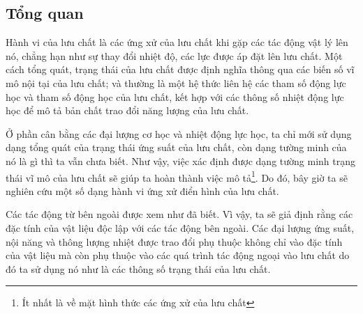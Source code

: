 \documentclass[../../../main.tex]{subfiles}
\begin{document}
\subsection{Tổng quan}
	Hành vi của lưu chất là các ứng xử của lưu chất khi gặp các tác động vật lý lên nó, chẳng hạn như sự thay đổi nhiệt độ, các lực được áp đặt lên lưu chất. Một cách tổng quát, trạng thái của lưu chất được định nghĩa thông qua các biến số vĩ mô nội tại của lưu chất; và thường là một hệ thức liên hệ các tham số động lực học và tham số động học của lưu chất, kết hợp với các thông số nhiệt động lực học để mô tả bản chất trao đổi năng lượng của lưu chất.
	
	Ở phần cân bằng các đại lượng cơ học và nhiệt động lực học, ta chỉ mới sử dụng dạng tổng quát của trạng thái ứng suất của lưu chất, còn dạng tường minh của nó là gì thì ta vẫn chưa biết. Như vậy, việc xác định được dạng tường minh trạng thái vĩ mô của lưu chất sẽ giúp ta hoàn thành việc mô tả\footnote{Ít nhất là về mặt hình thức các ứng xử của lưu chất}. Do đó, bây giờ ta sẽ nghiên cứu một số dạng hành vi ứng xử điển hình của lưu chất.

    Các tác động từ bên ngoài được xem như đã biết. Vì vậy, ta sẽ giả định rằng các đặc tính của vật liệu độc lập với các tác động bên ngoài. Các đại lượng ứng suất, nội năng và thông lượng nhiệt được trao đổi phụ thuộc không chỉ vào đặc tính của vật liệu mà còn phụ thuộc vào các quá trình tác động ngoại vào lưu chất do đó ta sử dụng nó như là các thông số trạng thái của lưu chất.
\end{document}
